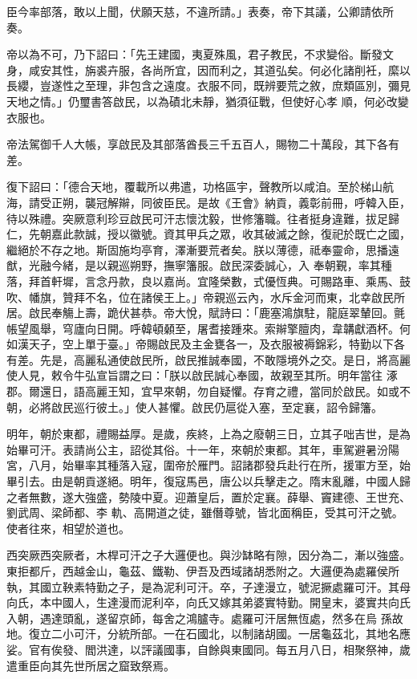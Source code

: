 \begin{pinyinscope}
 臣今率部落，敢以上聞，伏願天慈，不違所請。」表奏，帝下其議，公卿請依所奏。



 帝以為不可，乃下詔曰：「先王建國，夷夏殊風，君子教民，不求變俗。斷發文身，咸安其性，旃裘卉服，各尚所宜，因而利之，其道弘矣。何必化諸削衽，縻以長纓，豈遂性之至理，非包含之遠度。衣服不同，既辨要荒之敘，庶類區別，彌見天地之情。」仍璽書答啟民，以為磧北未靜，猶須征戰，但使好心孝
 順，何必改變衣服也。



 帝法駕御千人大帳，享啟民及其部落酋長三千五百人，賜物二十萬段，其下各有差。



 復下詔曰：「德合天地，覆載所以弗遣，功格區宇，聲教所以咸洎。至於梯山航海，請受正朔，襲冠解辮，同彼臣民。是故《王會》納貢，義彰前冊，呼韓入臣，待以殊禮。突厥意利珍豆啟民可汗志懷沈毅，世修籓職。往者挺身違難，拔足歸仁，先朝嘉此款誠，授以徽號。資其甲兵之眾，收其破滅之餘，復祀於既亡之國，繼絕於不存之地。斯固施均亭育，澤漸要荒者矣。朕以薄德，祗奉靈命，思播遠猷，光融今緒，是以親巡朔野，撫寧籓服。啟民深委誠心，入
 奉朝覲，率其種落，拜首軒墀，言念丹款，良以嘉尚。宜隆榮數，式優恆典。可賜路車、乘馬、鼓吹、幡旗，贊拜不名，位在諸侯王上。」帝親巡云內，水斥金河而東，北幸啟民所居。啟民奉觴上壽，跪伏甚恭。帝大悅，賦詩曰：「鹿塞鴻旗駐，龍庭翠輦回。氈帳望風舉，穹廬向日開。呼韓頓顙至，屠耆接踵來。索辮擎膻肉，韋韝獻酒杯。何如漢天子，空上單于臺。」帝賜啟民及主金甕各一，及衣服被褥錦彩，特勤以下各有差。先是，高麗私通使啟民所，啟民推誠奉國，不敢隱境外之交。是日，將高麗使人見，敕令牛弘宣旨謂之曰：「朕以啟民誠心奉國，故親至其所。明年當往
 涿郡。爾還日，語高麗王知，宜早來朝，勿自疑懼。存育之禮，當同於啟民。如或不朝，必將啟民巡行彼土。」使人甚懼。啟民仍扈從入塞，至定襄，詔令歸籓。



 明年，朝於東都，禮賜益厚。是歲，疾終，上為之廢朝三日，立其子咄吉世，是為始畢可汗。表請尚公主，詔從其俗。十一年，來朝於東都。其年，車駕避暑汾陽宮，八月，始畢率其種落入寇，圍帝於雁門。詔諸郡發兵赴行在所，援軍方至，始畢引去。由是朝貢遂絕。明年，復寇馬邑，唐公以兵擊走之。隋末亂離，中國人歸之者無數，遂大強盛，勢陵中夏。迎蕭皇后，置於定襄。薛舉、竇建德、王世充、劉武周、梁師都、李
 軌、高開道之徒，雖僭尊號，皆北面稱臣，受其可汗之號。使者往來，相望於道也。



 西突厥西突厥者，木桿可汗之子大邏便也。與沙缽略有隙，因分為二，漸以強盛。東拒都斤，西越金山，龜茲、鐵勒、伊吾及西域諸胡悉附之。大邏便為處羅侯所執，其國立鞅素特勤之子，是為泥利可汗。卒，子達漫立，號泥撅處羅可汗。其母向氏，本中國人，生達漫而泥利卒，向氏又嫁其弟婆實特勤。開皇末，婆實共向氏入朝，遇達頭亂，遂留京師，每舍之鴻臚寺。處羅可汗居無恆處，然多在烏
 孫故地。復立二小可汗，分統所部。一在石國北，以制諸胡國。一居龜茲北，其地名應娑。官有俟發、閻洪達，以評議國事，自餘與東國同。每五月八日，相聚祭神，歲遣重臣向其先世所居之窟致祭焉。




\end{pinyinscope}
